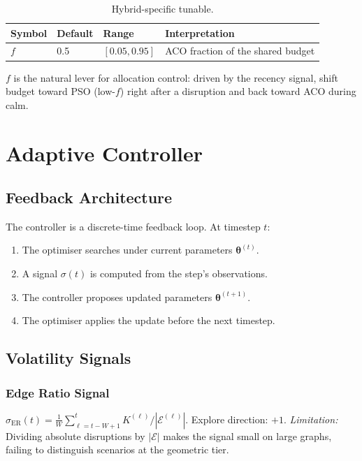 \documentclass[11pt,a4paper]{article}
\theoremstyle{definition}
\newcommand{\calE}{\mathcal{E}}
\begin{document}
\begin{table}[h]\centering
  \caption{Hybrid-specific tunable.}
  \begin{tabular}{lllp{6cm}}
    \toprule Symbol & Default & Range & Interpretation \\ \midrule
    $f$ & 0.5 & $[0.05,0.95]$ & ACO fraction of the shared budget \\
    \bottomrule
  \end{tabular}
\end{table}

$f$ is the natural lever for allocation control: driven by the recency signal, shift
budget toward PSO (low-$f$) right after a disruption and back toward ACO during calm.


\section{Adaptive Controller}
\label{sec:controller}

\subsection{Feedback Architecture}

The controller is a discrete-time feedback loop. At timestep $t$:
\begin{enumerate}[label=(\arabic*)]
  \item The optimiser searches under current parameters $\bm{\theta}^{(t)}$.
  \item A signal $\sigma(t)$ is computed from the step's observations.
  \item The controller proposes updated parameters $\bm{\theta}^{(t+1)}$.
  \item The optimiser applies the update before the next timestep.
\end{enumerate}

\subsection{Volatility Signals}

\subsubsection{Edge Ratio Signal}
$\sigma_{\text{ER}}(t) = \frac{1}{W} \sum_{\ell=t-W+1}^{t} K^{(\ell)}/|\calE^{(\ell)}|$.
Explore direction: $+1$.
\textit{Limitation:} Dividing absolute disruptions by $|\calE|$ makes the signal small
on large graphs, failing to distinguish scenarios at the geometric tier.
\end{document}
